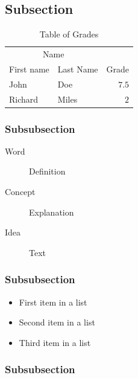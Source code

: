 \documentclass[fleqn,12pt]{NTFD} %
\begin{document}
\lipsum[10] %

\subsection{Subsection}

\lipsum[11] %

\begin{table}[hbt]
\caption{Table of Grades}
\centering
\begin{tabular}{llr}
\toprule
\multicolumn{2}{c}{Name} \\
\cmidrule(r){1-2}
First name & Last Name & Grade \\
\midrule
John & Doe & $7.5$ \\
Richard & Miles & $2$ \\
\bottomrule
\end{tabular}
\label{tab:label}
\end{table}

\subsubsection{Subsubsection}

\lipsum[12] %

\begin{description}
\item[Word] Definition
\item[Concept] Explanation
\item[Idea] Text
\end{description}

\subsubsection{Subsubsection}

\lipsum[13] %

\begin{itemize}[noitemsep] %
\item First item in a list
\item Second item in a list
\item Third item in a list
\end{itemize}

\subsubsection{Subsubsection}
\end{document}
